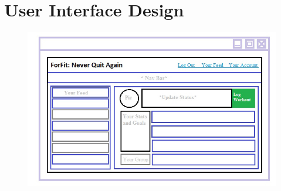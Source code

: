 \documentclass{article}
\newcommand{\br}{\multicolumn{2}{c}{} \\}
\begin{document}


\section{User Interface Design}
\begin{figure}[ht!]
    \centering
    \includegraphics[width=\textwidth]{Wireframe.jpg}
\end{figure}
\end{document}
